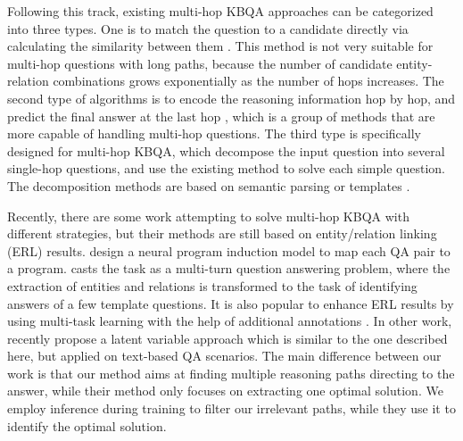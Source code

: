Following this track, existing multi-hop KBQA approaches can be categorized into three types. One is to match the question to a candidate directly via calculating the similarity between them \cite{DBLP:journals/corr/abs-1801-09893,DBLP:conf/adbis/YuHYZW18,DBLP:conf/ijcai/LanW019}. This method is not very suitable for multi-hop questions with long paths, because the number of candidate entity-relation combinations grows exponentially as the number of hops increases. The second type of algorithms is to encode the reasoning information hop by hop, and predict the final answer at the last hop \cite{DBLP:conf/emnlp/MillerFDKBW16,DBLP:conf/coling/ZhouHZ18,DBLP:conf/naacl/ChenCCNK19}, which is a group of methods that are more capable of handling multi-hop questions. The third type is specifically designed for multi-hop KBQA, which decompose the input question into several single-hop questions, and use the existing method to solve each simple question. The decomposition methods are based on semantic parsing \cite{DBLP:conf/www/AbujabalYRW17,DBLP:conf/emnlp/LuoLLZ18} or templates \cite{DBLP:journals/corr/abs-1908-11053}.

Recently, there are some work attempting to solve multi-hop KBQA with different strategies, but their methods are still based on entity/relation linking (ERL) results.  design a neural program induction model to map each QA pair to a program.  casts the task as a multi-turn question answering problem, where the extraction of entities and relations
is transformed to the task of identifying answers of a few template questions. It is also popular to enhance ERL results by using multi-task learning with the help of additional annotations \cite{DBLP:conf/aaai/DengXLYDFLS19,DBLP:conf/ijcai/ShaoGBJCLD19}. In other work,  recently propose a latent variable approach which is similar to the one described here, but applied on text-based QA scenarios. The main difference between our work is that our method aims at finding multiple reasoning paths directing to the answer, while their method only focuses on extracting one optimal solution. We employ inference during training to filter our irrelevant paths, while they use it to identify the optimal solution.
